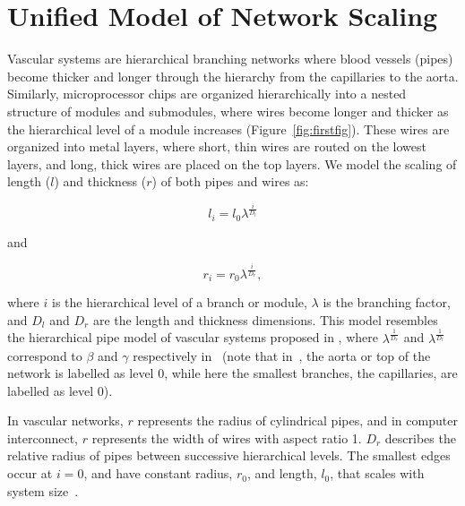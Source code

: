 \documentclass[12pt]{article}
\begin{document}
\section{Unified Model of Network Scaling}
\label{sec:unified-model}


Vascular systems are hierarchical branching networks where blood vessels
(pipes) become thicker and longer through the hierarchy from the capillaries
to the aorta. Similarly, microprocessor chips are organized hierarchically into
a nested structure of modules and submodules, where wires become longer and
thicker as the hierarchical level of a module increases
(Figure~\ref{fig:firstfig}).  These wires are organized into metal
layers, where short, thin wires are routed on the lowest layers, and long,
thick wires are placed on the top layers. We model the scaling of length ($l$)
and thickness ($r$) of both pipes and wires as:

\begin{equation}
l_i = l_0 \lambda^{\frac{i}{D_l}}
\end{equation}

\noindent and

\begin{equation}
  r_i = r_0 \lambda^{\frac{i}{D_r}},
\label{eq:rscaling}
\end{equation}

\noindent where $i$ is the hierarchical level of a branch or module, $\lambda$
is the branching factor, and $D_l$ and $D_r$ are the length and thickness
dimensions. This model resembles the hierarchical pipe model of vascular
systems proposed in \cite{west97}, where $\lambda^{\frac{1}{D_r}}$ and
$\lambda^{\frac{1}{D_l}}$ correspond to  $\beta$ and $\gamma$
respectively in~\cite{west97} (note that in~\cite{west97}, the aorta or top of the network is
labelled as level 0, while here the smallest branches, the capillaries, are
labelled as level 0).

In vascular networks, $r$ represents the radius of cylindrical pipes, and in
computer interconnect, $r$ represents the width of wires with aspect ratio 1.
$D_r$ describes the relative radius of pipes between successive hierarchical
levels.  The smallest edges occur at $i = 0$, and have constant radius, $r_0$,
and length, $l_0$, that scales with system size~\cite{banavar10}. 
\end{document}
